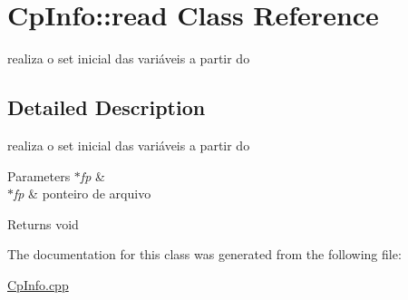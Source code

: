 \hypertarget{class_cp_info_1_1read}{}\section{Cp\+Info\+:\+:read Class Reference}
\label{class_cp_info_1_1read}


realiza o set inicial das variáveis a partir do  




\subsection{Detailed Description}
realiza o set inicial das variáveis a partir do 


\begin{DoxyParams}{Parameters}
{\em $\ast$fp} & \\
\hline
{\em $\ast$fp} & ponteiro de arquivo \\
\hline
\end{DoxyParams}
\begin{DoxyReturn}{Returns}
void 
\end{DoxyReturn}


The documentation for this class was generated from the following file\+:\begin{DoxyCompactItemize}
\item 
\hyperlink{_cp_info_8cpp}{Cp\+Info.\+cpp}\end{DoxyCompactItemize}
